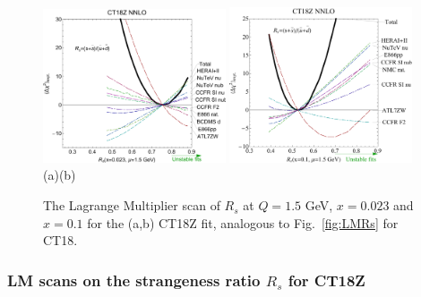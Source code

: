 %
\begin{figure}[htbp]
\begin{center}
	\includegraphics[width=0.48\textwidth]{./fig/Rs_scan2Tct18z_1.pdf}\quad
	\includegraphics[width=0.48\textwidth]{./fig/Rs_scan2Tct18z_2.pdf}\\
(a)\hspace{2.6in}(b)\\
	\caption{The Lagrange Multiplier scan of $R_s$ at $Q=1.5$ GeV, $x=0.023$ and $x=0.1$ for the (a,b) CT18Z fit, analogous to Fig.~\ref{fig:LMRs} for CT18.
\label{fig:lm_rsz}}
\end{center}
\end{figure}
%


\subsubsection{LM scans on the strangeness ratio $R_s$ for CT18Z}
\label{sec:LMRsCT18Z}

